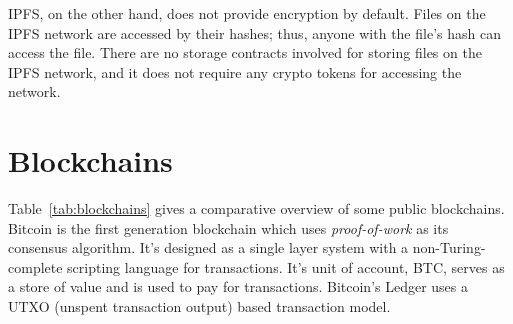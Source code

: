 		IPFS, on the other hand, does not provide encryption by default. Files on the IPFS network are accessed by their hashes; thus, anyone with the file's hash can access the file. There are no storage contracts involved for storing files on the IPFS network, and it does not require any crypto tokens for accessing the network.
		
		\section{Blockchains}
		Table~\ref{tab:blockchains} gives a comparative overview of some public blockchains. Bitcoin\cite{nakamoto2008bitcoin} is the first generation blockchain which uses \textit{proof-of-work} as its consensus algorithm. It's designed as a single layer system with a non-Turing-complete scripting language \cite{wiki:bitcoin:script:2} for transactions. It's unit of account, BTC, serves as a store of value and is used to pay for transactions. Bitcoin's Ledger uses a UTXO (unspent transaction output) based transaction model.
	
